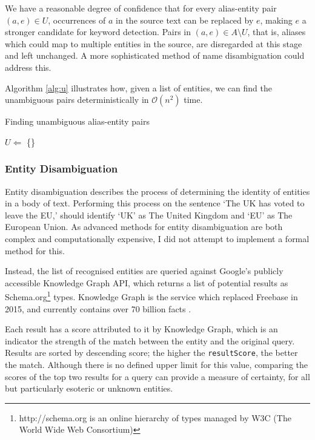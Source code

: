 We have a reasonable degree of confidence that for every alias-entity pair $(a, e) \in U$, occurrences of $a$ in the source text can be replaced by $e$, making $e$ a stronger candidate for keyword detection. Pairs in $(a, e) \in A\setminus{U}$, that is, aliases which could map to multiple entities in the source, are disregarded at this stage and left unchanged. A more sophisticated method of name disambiguation could address this.

Algorithm \ref{alg:u} illustrates how, given a list of entities, we can find the unambiguous pairs deterministically in $\mathcal{O}(n^2)$ time. 

\begin{algorithm}
\label{alg:u}
 \caption{Finding unambiguous alias-entity pairs}
 $U \Leftarrow$ \{\}\;
\end{algorithm}


\subsubsection{Entity Disambiguation}

Entity disambiguation describes the process of determining the identity of entities in a body of text. Performing this process on the sentence `The UK has voted to leave the EU,' should identify `UK' as The United Kingdom and `EU' as The European Union. As advanced methods for entity disambiguation are both complex and computationally expensive, I did not attempt to implement a formal method for this. 

Instead, the list of recognised entities are queried against Google's publicly accessible Knowledge Graph API, which returns a list of potential results as Schema.org\footnote{http://schema.org is an online hierarchy of types managed by W3C (The World Wide Web Consortium)} types. Knowledge Graph is the service which replaced Freebase in 2015, and currently contains over 70 billion facts \citep{knowledgegraph}.

Each result has a score attributed to it by Knowledge Graph, which is an indicator the strength of the match between the entity and the original query. Results are sorted by descending score; the higher the \texttt{resultScore}, the better the match. Although there is no defined upper limit for this value, comparing the scores of the top two results for a query can provide a measure of certainty, for all but particularly esoteric or unknown entities.

